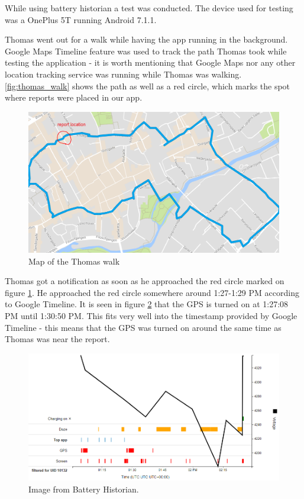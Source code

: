 While using battery historian a test was conducted. The device used for testing was a OnePlus 5T running Android 7.1.1. 

Thomas went out for a walk while having the app running in the background. Google Maps Timeline feature was used to track the path Thomas took while testing the application - it is worth mentioning that Google Maps nor any other location tracking service was running while Thomas was walking. \autoref{fig:thomas_walk} shows the path as well as a red circle, which marks the spot where reports were placed in our app.

\begin{figure}[H]
\centering
\includegraphics[width=\linewidth]{images/thomas_walk}
\caption{Map of the Thomas walk} 
\label{fig:thomas_walk}
\end{figure}


Thomas got a notification as soon as he approached the red circle marked on figure \ref{fig:thomas_walk}. He approached the red circle somewhere around 1:27-1:29 PM according to Google Timeline. It is seen in figure \ref{fig:battery_stats_1} that the GPS is turned on at 1:27:08 PM until 1:30:50 PM. This fits very well into the timestamp provided by Google Timeline - this means that the GPS was turned on around the same time as Thomas was near the report.

\begin{figure}[H]
\centering
\includegraphics[width=\linewidth]{images/battery_hist}
\caption{Image from Battery Historian.} 
\label{fig:battery_stats_1}
\end{figure}


